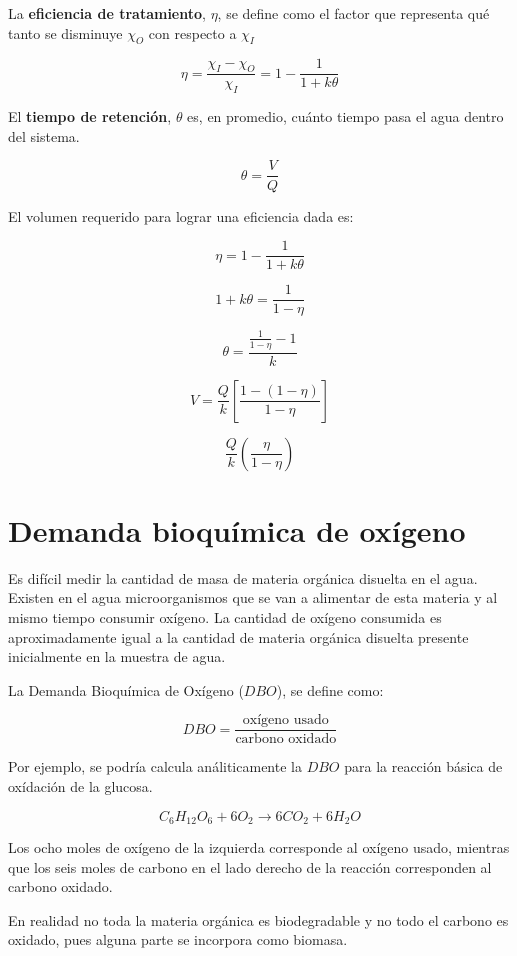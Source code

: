 \documentclass[11pt]{article}
\begin{document}
La \textbf{eficiencia de tratamiento}, \( \eta \), se define como el factor que representa qué tanto se disminuye \( \chi_O \) con respecto a \( \chi_I \)

\[ \boxed{ \eta = \frac{ \chi_I - \chi_O }{\chi_I} = 1 - \frac{1}{ 1 + k \theta } } \]

El \textbf{tiempo de retención}, \( \theta \) es, en promedio, cuánto tiempo pasa el agua dentro del sistema.

\[ \theta = \frac{V}{Q} \]

El volumen requerido para lograr una eficiencia dada es:

\[ \eta = 1 - \frac{1}{ 1 + k \theta } \]

\[ 1 + k \theta = \frac{1}{ 1 - \eta } \]

\[ \theta = \frac{ \frac{1}{ 1  - \eta } - 1 }{k} \]

\[ V = \frac{Q}{k} \left[ \frac{ 1 - \left( 1 - \eta \right) }{ 1 - \eta } \right] \]

\[ \boxed{ \frac{Q}{k} \left( \frac{\eta}{ 1 - \eta } \right) } \]

\section{Demanda bioquímica de oxígeno}

Es difícil medir la cantidad de masa de materia orgánica disuelta en el agua. Existen en el agua microorganismos que se van a alimentar de esta materia y al mismo tiempo consumir oxígeno. La cantidad de oxígeno consumida es aproximadamente igual a la cantidad de materia orgánica disuelta presente inicialmente en la muestra de agua.

La Demanda Bioquímica de Oxígeno (\( DBO \)), se define como:

\[ DBO = \frac{\text{oxígeno usado}}{\text{carbono oxidado}} \]

Por ejemplo, se podría calcula análiticamente la \( DBO \) para la reacción básica de oxídación de la glucosa.

\[ C_6 H_{12} O_6 + 6 O_2 \longrightarrow 6 CO_2 + 6 H_2 O \]

Los ocho moles de oxígeno de la izquierda corresponde al oxígeno usado, mientras que los seis moles de carbono en el lado derecho de la reacción corresponden al carbono oxidado.

En realidad no toda la materia orgánica es biodegradable y no todo el carbono es oxidado, pues alguna parte se incorpora como biomasa.
\end{document}
